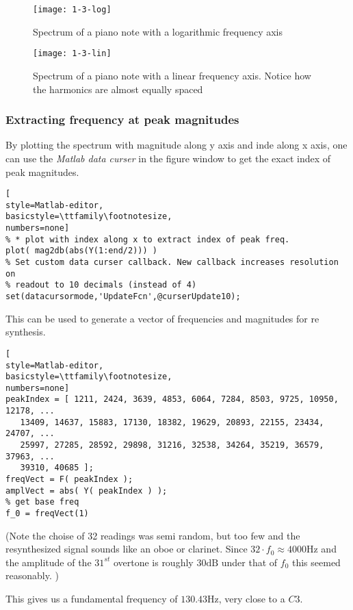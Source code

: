 \begin{figure}
	\center
	\texttt{[image: 1-3-log]}
	\caption{ Spectrum of a piano note with a logarithmic frequency
axis }
	\label{fig:1-3-log}
\end{figure}	

\begin{figure}
	\center
	\texttt{[image: 1-3-lin]}
	\caption{ Spectrum of a piano note with a linear frequency
axis. Notice how the harmonics are almost equally spaced }
	\label{fig:1-3-lin}
\end{figure}

\subsubsection{ Extracting frequency at peak magnitudes }
By plotting the spectrum with magnitude along y axis and inde along x axis, one
can use the \emph{Matlab data curser} in the figure window to get the exact
index of peak magnitudes.
\begin{lstlisting}[
style=Matlab-editor,
basicstyle=\ttfamily\footnotesize,
numbers=none]
% * plot with index along x to extract index of peak freq.
plot( mag2db(abs(Y(1:end/2))) )
% Set custom data curser callback. New callback increases resolution on
% readout to 10 decimals (instead of 4)
set(datacursormode,'UpdateFcn',@curserUpdate10);
\end{lstlisting}

This can be used to generate a vector of frequencies and magnitudes for re
synthesis.

\begin{lstlisting}[
style=Matlab-editor,
basicstyle=\ttfamily\footnotesize,
numbers=none]
peakIndex = [ 1211, 2424, 3639, 4853, 6064, 7284, 8503, 9725, 10950, 12178, ...
   13409, 14637, 15883, 17130, 18382, 19629, 20893, 22155, 23434, 24707, ...
   25997, 27285, 28592, 29898, 31216, 32538, 34264, 35219, 36579, 37963, ...
   39310, 40685 ]; 
freqVect = F( peakIndex );
amplVect = abs( Y( peakIndex ) );
% get base freq
f_0 = freqVect(1)
\end{lstlisting}
(Note the choise of 32 readings was semi random, but too few and the
resynthesized signal sounds like an oboe or clarinet. Since $32\cdot f_0
\approx 4000\mbox{Hz}$ and the amplitude of the $31^{st}$ overtone is roughly
$30\mbox{dB}$ under that of $f_0$ this seemed reasonably. )

This gives us a fundamental frequency of $130.43\mbox{Hz}$, very close to a
$C3$.

